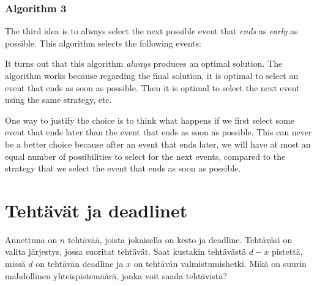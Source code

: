\subsubsection*{Algorithm 3}

The third idea is to always select the next
possible event that \emph{ends} as \emph{early} as possible.
This algorithm selects the following events: 
\begin{center}
\end{center}

It turns out that this algorithm
\emph{always} produces an optimal solution.
The algorithm works because 
regarding the final solution, it is
optimal to select an event that
ends as soon as possible.
Then it is optimal to select
the next event using the same strategy, etc.

One way to justify the choice is to think
what happens if we first select some event
that ends later than the event that ends
as soon as possible.
This can never be a better choice
because after an event that ends later,
we will have at most an equal number of
possibilities to select for the next events,
compared to the strategy that we select the
event that ends as soon as possible.

\section{Tehtävät ja deadlinet}

Annettuna on $n$ tehtävää,
joista jokaisella on kesto ja deadline.
Tehtäväsi on valita järjestys,
jossa suoritat tehtävät.
Saat kustakin tehtävästä $d-x$ pistettä,
missä $d$ on tehtävän deadline ja $x$
on tehtävän valmistumishetki.
Mikä on suurin mahdollinen
yhteispistemäärä, jonka voit saada tehtävistä?

